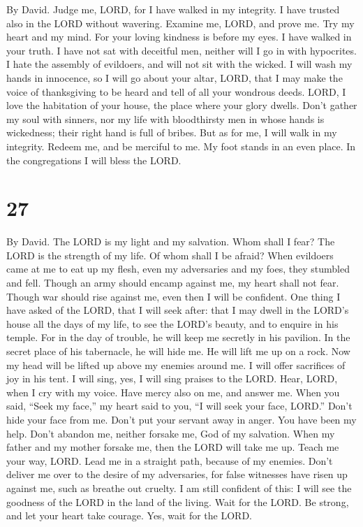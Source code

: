 By David.  Judge me, LORD, for I have walked in my
integrity. I have trusted also in the LORD without wavering.
 Examine me, LORD, and prove me. Try my heart and my mind.
 For your loving kindness is before my eyes. I have walked
in your truth.  I have not sat with deceitful men, neither
will I go in with hypocrites.  I hate the assembly of
evildoers, and will not sit with the wicked.  I will wash
my hands in innocence, so I will go about your altar, LORD,
 that I may make the voice of thanksgiving to be heard and
tell of all your wondrous deeds.  LORD, I love the
habitation of your house, the place where your glory dwells.
 Don't gather my soul with sinners, nor my life with
bloodthirsty men  in whose hands is wickedness; their
right hand is full of bribes.  But as for me, I will walk
in my integrity. Redeem me, and be merciful to me.  My
foot stands in an even place. In the congregations I will bless the
LORD.

\hypertarget{section-26}{%
\section{27}\label{section-26}}

By David.  The LORD is my light and my salvation. Whom
shall I fear? The LORD is the strength of my life. Of whom shall I be
afraid?  When evildoers came at me to eat up my flesh,
even my adversaries and my foes, they stumbled and fell. 
Though an army should encamp against me, my heart shall not fear. Though
war should rise against me, even then I will be confident.
 One thing I have asked of the LORD, that I will seek
after: that I may dwell in the LORD's house all the days of my life, to
see the LORD's beauty, and to enquire in his temple.  For
in the day of trouble, he will keep me secretly in his pavilion. In the
secret place of his tabernacle, he will hide me. He will lift me up on a
rock.  Now my head will be lifted up above my enemies
around me. I will offer sacrifices of joy in his tent. I will sing, yes,
I will sing praises to the LORD.  Hear, LORD, when I cry
with my voice. Have mercy also on me, and answer me.  When
you said, ``Seek my face,'' my heart said to you, ``I will seek your
face, LORD.''  Don't hide your face from me. Don't put
your servant away in anger. You have been my help. Don't abandon me,
neither forsake me, God of my salvation.  When my father
and my mother forsake me, then the LORD will take me up. 
Teach me your way, LORD. Lead me in a straight path, because of my
enemies.  Don't deliver me over to the desire of my
adversaries, for false witnesses have risen up against me, such as
breathe out cruelty.  I am still confident of this: I
will see the goodness of the LORD in the land of the living.
 Wait for the LORD. Be strong, and let your heart take
courage. Yes, wait for the LORD.

